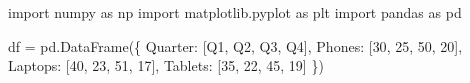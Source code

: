 \documentclass[
  english,
  letterpaper,
  DIV=11,
  numbers=noendperiod]{scrreprt}
\newenvironment{Shaded}{\begin{snugshade}}{\end{snugshade}}
\newcommand{\DecValTok}[1]{\textcolor[rgb]{0.68,0.00,0.00}{#1}}
\newcommand{\ImportTok}[1]{\textcolor[rgb]{0.00,0.46,0.62}{#1}}
\newcommand{\NormalTok}[1]{\textcolor[rgb]{0.00,0.23,0.31}{#1}}
\newcommand{\OperatorTok}[1]{\textcolor[rgb]{0.37,0.37,0.37}{#1}}
\newcommand{\StringTok}[1]{\textcolor[rgb]{0.13,0.47,0.30}{#1}}
\begin{document}
\begin{Shaded}
\begin{Highlighting}[]
\ImportTok{import}\NormalTok{ numpy }\ImportTok{as}\NormalTok{ np}
\ImportTok{import}\NormalTok{ matplotlib.pyplot }\ImportTok{as}\NormalTok{ plt}
\ImportTok{import}\NormalTok{ pandas }\ImportTok{as}\NormalTok{ pd}

\NormalTok{df }\OperatorTok{=}\NormalTok{ pd.DataFrame(\{}
    \StringTok{\textquotesingle{}Quarter\textquotesingle{}}\NormalTok{: [}\StringTok{\textquotesingle{}Q1\textquotesingle{}}\NormalTok{, }\StringTok{\textquotesingle{}Q2\textquotesingle{}}\NormalTok{, }\StringTok{\textquotesingle{}Q3\textquotesingle{}}\NormalTok{, }\StringTok{\textquotesingle{}Q4\textquotesingle{}}\NormalTok{],}
    \StringTok{\textquotesingle{}Phones\textquotesingle{}}\NormalTok{: [}\DecValTok{30}\NormalTok{, }\DecValTok{25}\NormalTok{, }\DecValTok{50}\NormalTok{, }\DecValTok{20}\NormalTok{],}
    \StringTok{\textquotesingle{}Laptops\textquotesingle{}}\NormalTok{: [}\DecValTok{40}\NormalTok{, }\DecValTok{23}\NormalTok{, }\DecValTok{51}\NormalTok{, }\DecValTok{17}\NormalTok{],}
    \StringTok{\textquotesingle{}Tablets\textquotesingle{}}\NormalTok{: [}\DecValTok{35}\NormalTok{, }\DecValTok{22}\NormalTok{, }\DecValTok{45}\NormalTok{, }\DecValTok{19}\NormalTok{]}
\NormalTok{\})}


\end{Highlighting}
\end{Shaded}
\end{document}
